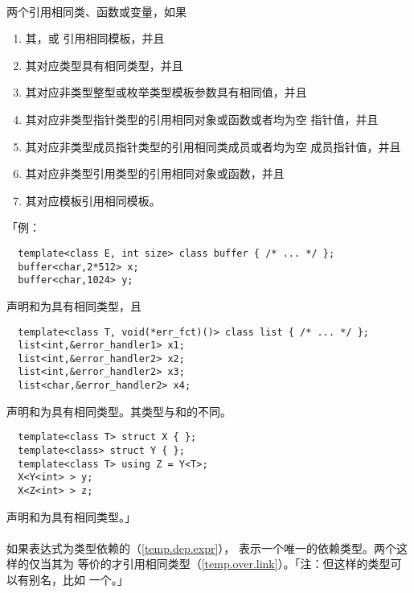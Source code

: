 \paragraph{}
两个引用相同类、函数或变量，如果
\begin{enumerate}
  \item{其，或
    引用相同模板，并且}
  \item{其对应类型具有相同类型，并且}
  \item{其对应非类型整型或枚举类型模板参数具有相同值，并且}
  \item{其对应非类型指针类型的引用相同对象或函数或者均为空
    指针值，并且}
  \item{其对应非类型成员指针类型的引用相同类成员或者均为空
    成员指针值，并且}
  \item{其对应非类型引用类型的引用相同对象或函数，并且}
  \item{其对应模板引用相同模板。}
\end{enumerate}
「例：
\begin{lstlisting}
  template<class E, int size> class buffer { /* ... */ };
  buffer<char,2*512> x;
  buffer<char,1024> y;
\end{lstlisting}
声明和为具有相同类型，且
\begin{lstlisting}
  template<class T, void(*err_fct)()> class list { /* ... */ };
  list<int,&error_handler1> x1;
  list<int,&error_handler2> x2;
  list<int,&error_handler2> x3;
  list<char,&error_handler2> x4;
\end{lstlisting}
声明和为具有相同类型。其类型与和的不同。
\begin{lstlisting}
  template<class T> struct X { };
  template<class> struct Y { };
  template<class T> using Z = Y<T>;
  X<Y<int> > y;
  X<Z<int> > z;
\end{lstlisting}
声明和为具有相同类型。」

\paragraph{}
如果表达式为类型依赖的（\ref{temp.dep.expr}），\tm{)}
表示一个唯一的依赖类型。两个这样的仅当其为
等价的才引用相同类型（\ref{temp.over.link}）。「注：但这样的类型可以有别名，比如
一个。」

